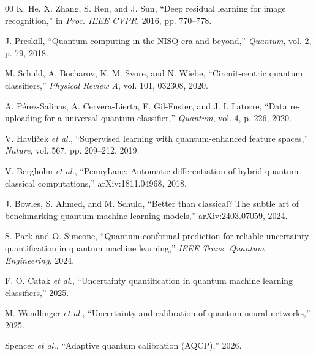 \documentclass[conference]{IEEEtran}
\begin{document}
\begin{thebibliography}{00}
K. He, X. Zhang, S. Ren, and J. Sun, ``Deep residual learning for image recognition,'' in \emph{Proc. IEEE CVPR}, 2016, pp. 770--778.

J. Preskill, ``Quantum computing in the NISQ era and beyond,'' \emph{Quantum}, vol. 2, p. 79, 2018.

M. Schuld, A. Bocharov, K. M. Svore, and N. Wiebe, ``Circuit-centric quantum classifiers,'' \emph{Physical Review A}, vol. 101, 032308, 2020.

A. P\'erez-Salinas, A. Cervera-Lierta, E. Gil-Fuster, and J. I. Latorre, ``Data re-uploading for a universal quantum classifier,'' \emph{Quantum}, vol. 4, p. 226, 2020.

V. Havl\'i\v{c}ek \emph{et al.}, ``Supervised learning with quantum-enhanced feature spaces,'' \emph{Nature}, vol. 567, pp. 209--212, 2019.

V. Bergholm \emph{et al.}, ``PennyLane: Automatic differentiation of hybrid quantum-classical computations,'' arXiv:1811.04968, 2018.

J. Bowles, S. Ahmed, and M. Schuld, ``Better than classical? The subtle art of benchmarking quantum machine learning models,'' arXiv:2403.07059, 2024.

S. Park and O. Simeone, ``Quantum conformal prediction for reliable uncertainty quantification in quantum machine learning,'' \emph{IEEE Trans. Quantum Engineering}, 2024.

F. O. Catak \emph{et al.}, ``Uncertainty quantification in quantum machine learning classifiers,'' 2025.

M. Wendlinger \emph{et al.}, ``Uncertainty and calibration of quantum neural networks,'' 2025.

Spencer \emph{et al.}, ``Adaptive quantum calibration (AQCP),'' 2026.

\end{thebibliography}
\end{document}
